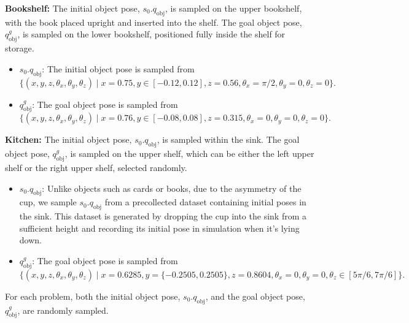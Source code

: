 \textbf{Bookshelf:} The initial object pose, $s_0.q_\text{obj}$,  is sampled on the upper bookshelf, with the book placed upright and inserted into the shelf. The goal object pose, $q^g_\text{obj}$, is sampled on the lower bookshelf, positioned fully inside the shelf for storage.
\begin{itemize}
    \item $s_0.q_\text{obj}$: The initial object pose is sampled from 
    \[
    \{(x, y, z, \theta_x, \theta_y, \theta_z) \mid x = 0.75, y \in [-0.12, 0.12], 
    z = 0.56, \theta_x = \pi/2, \theta_y = 0, \theta_z = 0\}.
    \]
    \item $q^g_\text{obj}$: The goal object pose is sampled from 
    \[
    \{(x, y, z, \theta_x, \theta_y, \theta_z) \mid x = 0.76, y \in [-0.08, 0.08], z = 0.315, \theta_x = 0, \theta_y = 0, \theta_z = 0\}.
    \]
\end{itemize}

\textbf{Kitchen:} The initial object pose, $s_0.q_\text{obj}$, is sampled within the sink. The goal object pose, $q^g_\text{obj}$, is sampled on the upper shelf, which can be either the left upper shelf or the right upper shelf, selected randomly. 

\begin{itemize}
    \item $s_0.q_\text{obj}$:
    Unlike objects such as cards or books, due to the asymmetry of the cup, we sample $s_0.q_\text{obj}$
from a precollected dataset containing initial poses in the sink. This dataset is generated by dropping the cup into the sink from a sufficient height and recording its initial pose in simulation when it's lying down.
    \item $q^g_\text{obj}$:
    The goal object pose is sampled from 
    \[
    \{(x, y, z, \theta_x, \theta_y, \theta_z) \mid x = 0.6285, y = \{-0.2505, 0.2505\}, 
    z = 0.8604, \theta_x = 0, \theta_y = 0, \theta_z \in [5\pi/6, 7\pi/6]\}.
    \]
\end{itemize}


For each problem, both the initial object pose, $s_0.q_\text{obj}$, and the goal object pose, $q^g_\text{obj}$, are randomly sampled.
